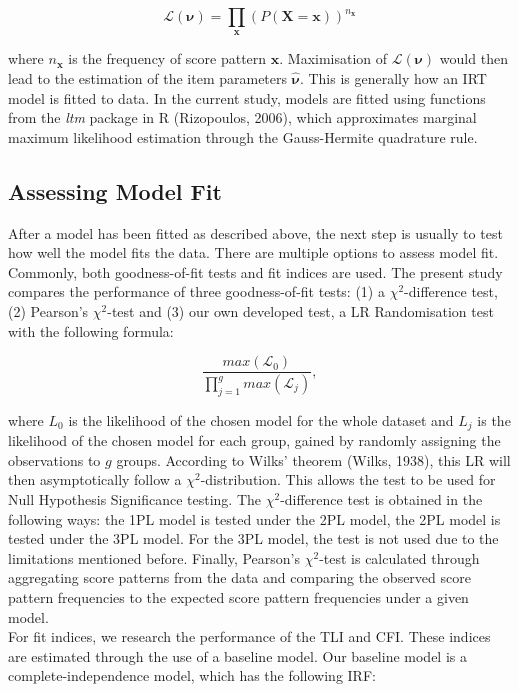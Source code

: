 \documentclass[Royal,sageapa,times,doublespace]{sagej}
\begin{document}
\begin{equation}
\mathcal{L}(\boldsymbol{\nu}) = \prod_{\boldsymbol{x}} (P(\boldsymbol{X} = \boldsymbol{x}))^{n_{\boldsymbol{x}}}
\end{equation}

where $n_{\boldsymbol{x}}$ is the frequency of score pattern $\boldsymbol{x}$. Maximisation of $\mathcal{L}(\boldsymbol{\nu})$ would then lead to the estimation of the item parameters $\boldsymbol{\hat{\nu}}$. This is generally how an IRT model is fitted to data. In the current study, models are fitted using functions from the \textit{ltm} package in R (Rizopoulos, 2006), which approximates marginal maximum likelihood estimation through the Gauss-Hermite quadrature rule.
\subsection{Assessing Model Fit}
\indent After a model has been fitted as described above, the next step is usually to test how well the model fits the data. There are multiple options to assess model fit. Commonly, both goodness-of-fit tests and fit indices are used. The present study compares the performance of three goodness-of-fit tests: (1) a $\chi^2$-difference test, (2) Pearson's $\chi^2$-test and (3) our own developed test, a LR Randomisation test with the following formula:

\begin{equation}
\frac{max(\mathcal{L}_0)}{\prod_{j = 1}^g max(\mathcal{L}_j)},
\end{equation}

where $L_0$ is the likelihood of the chosen model for the whole dataset and $L_j$ is the likelihood of the chosen model for each group, gained by randomly assigning the observations to $g$ groups. According to Wilks' theorem (Wilks, 1938), this LR will then asymptotically follow a $\chi^2$-distribution. This allows the test to be used for Null Hypothesis Significance testing. The $\chi^2$-difference test is obtained in the following ways: the 1PL model is tested under the 2PL model, the 2PL model is tested under the 3PL model. For the 3PL model, the test is not used due to the limitations mentioned before. Finally, Pearson's $\chi^2$-test is calculated through aggregating score patterns from the data and comparing the observed score pattern frequencies to the expected score pattern frequencies under a given model. \\
\indent For fit indices, we research the performance of the TLI and CFI. These indices are estimated through the use of a baseline model. Our baseline model is a complete-independence model, which has the following IRF:
\end{document}
